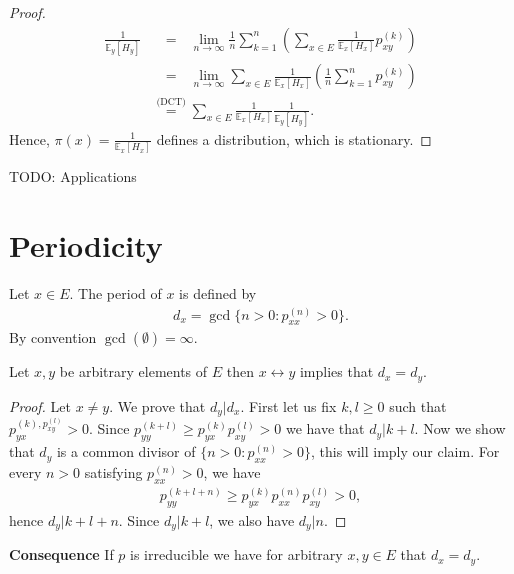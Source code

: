 \begin{proof}
\begin{align}
	\frac{1}{\mathbb{E}_{y} \left[ H_y \right] } &\stackrel{\phantom{\textrm{(DCT)}}}{=} \lim_{n \to \infty } \frac{1}{n} \sum_{k=1}^{n}  \left( \sum_{x \in E}^{} \frac{1}{\mathbb{E}_{x} \left[ H_x \right] } p_{xy}^{(k)} \right) \\
						     &\stackrel{\phantom{\textrm{(DCT)}}}{=} \lim_{n \to \infty }\sum_{x \in E}^{} \frac{1}{\mathbb{E}_{x} \left[ H_x \right] } \left( \frac{1}{n} \sum_{k=1}^{n} p_{xy}^{(k)} \right) \\
						     &\stackrel{\textrm{(DCT)}}{=} \sum_{x \in E}^{} \frac{1}{\mathbb{E}_{x} \left[ H_x \right] } \frac{1}{\mathbb{E}_{y} \left[ H_y \right] }
.\end{align}
Hence, $\pi(x) = \frac{1}{\mathbb{E}_{x} \left[ H_x \right] } $ defines a distribution, which is stationary.
\end{proof}

TODO: Applications

\section{Periodicity}
\begin{defn}
	Let $x \in E$. The period of $x$ is defined by
	\begin{align}
	\boxed{d_x = \gcd\{n> 0: p_{xx}^{(n)}>0\} }
	.\end{align}
	By convention $\gcd(\emptyset)=\infty$.	
\end{defn}

\begin{prop}[]
	Let $x,y$ be arbitrary elements of $ E$ then $ x \leftrightarrow y$ implies that $d_x=d_y$.
\end{prop}
\begin{proof}
	Let $x\neq y$. We prove that $d_y | d_x$. First let us fix $k,l\geq 0$ such that $p_{yx}^{(k), p_{xy}^{(l)}}> 0$. Since $p_{yy}^{(k+l)}\geq p_{yx}^{(k)}p_{xy}^{(l)}> 0$ we have that $d_y | k+l$. Now we show that $d_y$ is a common divisor of $\{n> 0: p_{xx}^{(n)}> 0\}$, this will imply our claim. For every $n> 0$ satisfying $p_{xx}^{(n)}>0$, we have 
	\begin{align}
		p_{yy}^{(k+l+n)} \geq p_{yx}^{(k)}p_{xx}^{(n)}p_{xy}^{(l)} > 0,
	\end{align}
hence $d_y | k+l+n$. Since $d_y | k+l$, we also have $d_y|n$.	
\end{proof}


\textbf{Consequence} If $p$ is irreducible we have for arbitrary $x,y \in E$ that $d_x = d_y$.

